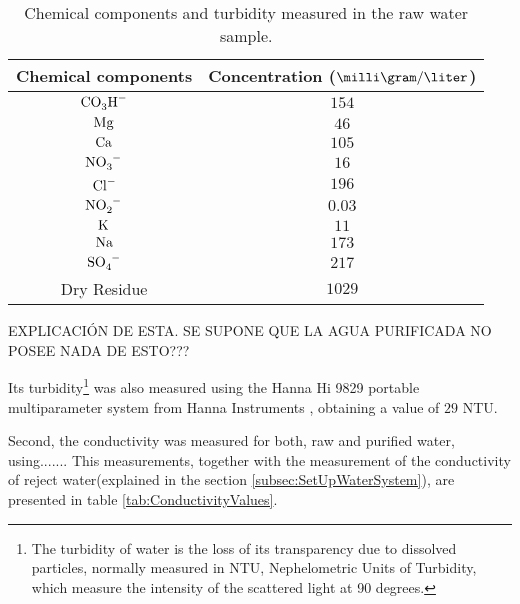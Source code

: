 \begin{table}[htbp]
\begin{center}
\begin{tabular}{|c|c|}
\hline
Chemical components & Concentration ($\milli\gram/\liter$)\\
\hline \hline \hline
$\ce{CO_{3}H^-}$ & $154$ \\ \hline
$\ce{Mg}$ & $46$ \\ \hline
$\ce{Ca}$ & $105$ \\ \hline
$\ce{NO_{3}^-}$ & $16$ \\ \hline
$\ce{Cl^-}$ & $196$ \\ \hline
$\ce{NO_{2}^-}$ & $0.03$ \\ \hline
$\ce{K}$ & $11$ \\ \hline
$\ce{Na}$ & $173$ \\ \hline
$\ce{SO_{4}^-}$ & $217$ \\ \hline
Dry Residue & $1029$ \\ \hline
\end{tabular}
\caption{Chemical components and turbidity measured in the raw water sample.}
\label{tab:ChemicalComponentsRawWater}
\end{center}
\end{table}

EXPLICACIÓN DE ESTA. SE SUPONE QUE LA AGUA PURIFICADA NO POSEE NADA DE ESTO???

Its turbidity\footnote{The turbidity of water is the loss of its transparency due to dissolved particles, normally measured in NTU, Nephelometric Units of Turbidity, which measure the intensity of the scattered light at 90 degrees.} was also measured using the Hanna Hi 9829 portable multiparameter system from Hanna Instruments \cite{TurbiditySystem}, obtaining a value of $29$ NTU.

Second, the conductivity was measured for both, raw and purified water, using....... This measurements, together with the measurement of the conductivity of reject water(explained in the section \ref{subsec:SetUpWaterSystem}), are presented in table \ref{tab:ConductivityValues}.


